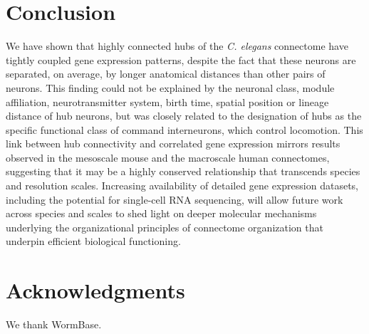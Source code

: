 \documentclass[10pt,letterpaper]{article}
\begin{document}
{\section*{Conclusion}

We have shown that highly connected hubs of the \textit{C. elegans} connectome have tightly coupled gene expression patterns, despite the fact that these neurons are separated, on average, by longer anatomical distances than other pairs of neurons.
This finding could not be explained by the neuronal class, module affiliation, neurotransmitter system, birth time, spatial position or lineage distance of hub neurons, but was closely related to the designation of hubs as the specific functional class of command interneurons, which control locomotion.
This link between hub connectivity and correlated gene expression mirrors results observed in the mesoscale mouse and the macroscale human connectomes, suggesting that it may be a highly conserved relationship that transcends species and resolution scales.
Increasing availability of detailed gene expression datasets, including the potential for single-cell RNA sequencing, will allow future work across species and scales to shed light on deeper molecular mechanisms underlying the organizational principles of connectome organization that underpin efficient biological functioning.

\section*{Acknowledgments}
We thank WormBase.

\nolinenumbers

%
%
%




}
\end{document}
